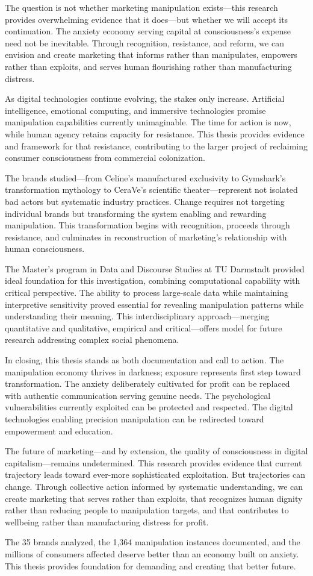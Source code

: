 The question is not whether marketing manipulation exists—this research provides overwhelming evidence that it does—but whether we will accept its continuation. The anxiety economy serving capital at consciousness's expense need not be inevitable. Through recognition, resistance, and reform, we can envision and create marketing that informs rather than manipulates, empowers rather than exploits, and serves human flourishing rather than manufacturing distress.

As digital technologies continue evolving, the stakes only increase. Artificial intelligence, emotional computing, and immersive technologies promise manipulation capabilities currently unimaginable. The time for action is now, while human agency retains capacity for resistance. This thesis provides evidence and framework for that resistance, contributing to the larger project of reclaiming consumer consciousness from commercial colonization.

The brands studied—from Celine's manufactured exclusivity to Gymshark's transformation mythology to CeraVe's scientific theater—represent not isolated bad actors but systematic industry practices. Change requires not targeting individual brands but transforming the system enabling and rewarding manipulation. This transformation begins with recognition, proceeds through resistance, and culminates in reconstruction of marketing's relationship with human consciousness.

The Master's program in Data and Discourse Studies at TU Darmstadt provided ideal foundation for this investigation, combining computational capability with critical perspective. The ability to process large-scale data while maintaining interpretive sensitivity proved essential for revealing manipulation patterns while understanding their meaning. This interdisciplinary approach—merging quantitative and qualitative, empirical and critical—offers model for future research addressing complex social phenomena.

In closing, this thesis stands as both documentation and call to action. The manipulation economy thrives in darkness; exposure represents first step toward transformation. The anxiety deliberately cultivated for profit can be replaced with authentic communication serving genuine needs. The psychological vulnerabilities currently exploited can be protected and respected. The digital technologies enabling precision manipulation can be redirected toward empowerment and education.

The future of marketing—and by extension, the quality of consciousness in digital capitalism—remains undetermined. This research provides evidence that current trajectory leads toward ever-more sophisticated exploitation. But trajectories can change. Through collective action informed by systematic understanding, we can create marketing that serves rather than exploits, that recognizes human dignity rather than reducing people to manipulation targets, and that contributes to wellbeing rather than manufacturing distress for profit.

The 35 brands analyzed, the 1,364 manipulation instances documented, and the millions of consumers affected deserve better than an economy built on anxiety. This thesis provides foundation for demanding and creating that better future.